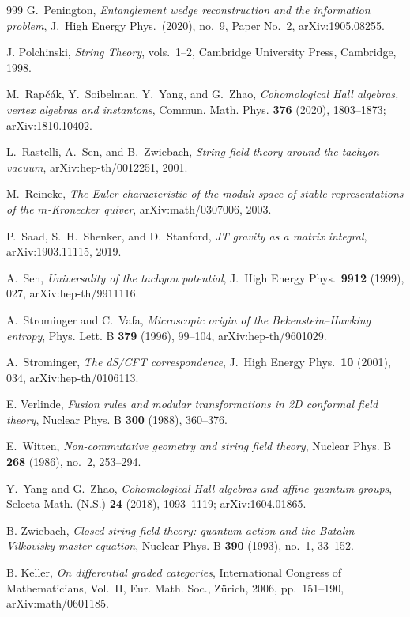 \begin{thebibliography}{999}
G.~Penington, \emph{Entanglement wedge reconstruction and the information problem}, J.\ High Energy Phys.\ (2020), no.~9, Paper No.~2, arXiv:1905.08255.

J. Polchinski, \emph{String Theory}, vols.~1--2, Cambridge University Press, Cambridge, 1998.

M.~Rap\v{c}\'ak, Y.~Soibelman, Y.~Yang, and G.~Zhao, \emph{Cohomological Hall algebras, vertex algebras and instantons}, Commun. Math. Phys. \textbf{376} (2020), 1803--1873; arXiv:1810.10402.

L.~Rastelli, A.~Sen, and B.~Zwiebach, \emph{String field theory around the tachyon vacuum}, arXiv:hep-th/0012251, 2001.

M.~Reineke, \emph{The Euler characteristic of the moduli space of stable representations of the $m$-Kronecker quiver}, arXiv:math/0307006, 2003.

P.~Saad, S.~H.~Shenker, and D.~Stanford, \emph{JT gravity as a matrix integral}, arXiv:1903.11115, 2019.

A.~Sen, \emph{Universality of the tachyon potential}, J.\ High Energy Phys.\ \textbf{9912} (1999), 027, arXiv:hep-th/9911116.

A.~Strominger and C.~Vafa, \emph{Microscopic origin of the Bekenstein--Hawking entropy}, Phys. Lett. B \textbf{379} (1996), 99--104, arXiv:hep-th/9601029.

A.~Strominger, \emph{The dS/CFT correspondence}, J.\ High Energy Phys.\ \textbf{10} (2001), 034, arXiv:hep-th/0106113.

E. Verlinde, \emph{Fusion rules and modular transformations in 2D conformal field theory}, Nuclear Phys. B \textbf{300} (1988), 360--376.

E.~Witten, \emph{Non-commutative geometry and string field theory}, Nuclear Phys. B \textbf{268} (1986), no.~2, 253--294.

Y.~Yang and G.~Zhao, \emph{Cohomological Hall algebras and affine quantum groups}, Selecta Math. (N.S.) \textbf{24} (2018), 1093--1119; arXiv:1604.01865.

B. Zwiebach, \emph{Closed string field theory: quantum action and the Batalin--Vilkovisky master equation}, Nuclear Phys. B \textbf{390} (1993), no.~1, 33--152.

B. Keller, \emph{On differential graded categories}, International Congress of Mathematicians, Vol.~II, Eur. Math. Soc., Z\"urich, 2006, pp.~151--190, arXiv:math/0601185.


\end{thebibliography}
